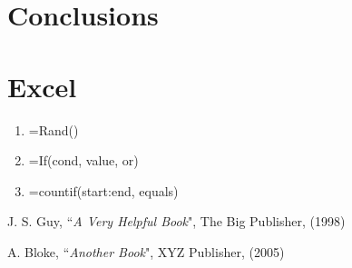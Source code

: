 \documentclass[a4paper,10pt]{article}
\begin{document}
\section{Conclusions}

\section{Excel}
\begin{enumerate}
	\item =Rand()
	\item =If(cond, value, or)
	\item =countif(start:end, equals)
\end{enumerate}

\begin{thebibliography}{99}


J. S. Guy, ``{\it A Very Helpful Book}", The Big Publisher, (1998)

A. Bloke, ``{\it Another Book}", XYZ Publisher, (2005)

\end{thebibliography}
\end{document}
